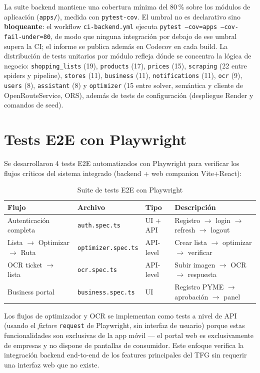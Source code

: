 La suite backend mantiene una cobertura m\'inima del 80\,\% sobre los m\'odulos de aplicaci\'on
(\texttt{apps/}), medida con \texttt{pytest-cov}. El umbral no es declarativo sino
\textbf{bloqueante}: el workflow \texttt{ci-backend.yml} ejecuta \texttt{pytest --cov=apps
--cov-fail-under=80}, de modo que ninguna integraci\'on por debajo de ese umbral supera la CI;
el informe se publica adem\'as en Codecov en cada build. La distribuci\'on de tests unitarios
por m\'odulo refleja d\'onde se concentra la l\'ogica de negocio: \texttt{shopping\_lists} (19),
\texttt{products} (17), \texttt{prices} (15), \texttt{scraping} (22 entre spiders y pipeline),
\texttt{stores} (11), \texttt{business} (11), \texttt{notifications} (11), \texttt{ocr} (9),
\texttt{users} (8), \texttt{assistant} (8) y \texttt{optimizer} (15 entre solver, sem\'antica y
cliente de OpenRouteService, ORS), adem\'as de tests de configuraci\'on (despliegue Render y
comandos de seed).

\section{Tests E2E con Playwright}\label{sec:playwright}

Se desarrollaron 4 tests E2E automatizados con Playwright para verificar los flujos cr\'iticos del
sistema integrado (backend + web companion Vite+React):

\begin{table}[htbp]
\centering
\caption{Suite de tests E2E con Playwright}
\label{tab:tests-e2e}
\small
\begin{tabular}{@{}llll@{}}
\toprule
\textbf{Flujo} & \textbf{Archivo} & \textbf{Tipo} & \textbf{Descripci\'on} \\
\midrule
Autenticaci\'on completa & \texttt{auth.spec.ts} & UI + API & Registro $\to$ login $\to$ refresh $\to$ logout \\
Lista $\to$ Optimizar $\to$ Ruta & \texttt{optimizer.spec.ts} & API-level & Crear lista $\to$ optimizar $\to$ verificar \\
OCR ticket $\to$ lista & \texttt{ocr.spec.ts} & API-level & Subir imagen $\to$ OCR $\to$ respuesta \\
Business portal & \texttt{business.spec.ts} & UI & Registro PYME $\to$ aprobaci\'on $\to$ panel \\
\bottomrule
\end{tabular}
\end{table}

Los flujos de optimizador y OCR se implementan como tests a nivel de API (usando el \emph{fixture}
\texttt{request} de Playwright, sin interfaz de usuario) porque estas funcionalidades son exclusivas
de la app m\'ovil --- el portal web es exclusivamente de empresas y no dispone de pantallas de
consumidor. Este enfoque verifica la integraci\'on backend end-to-end de los features principales
del TFG sin requerir una interfaz web que no existe.

